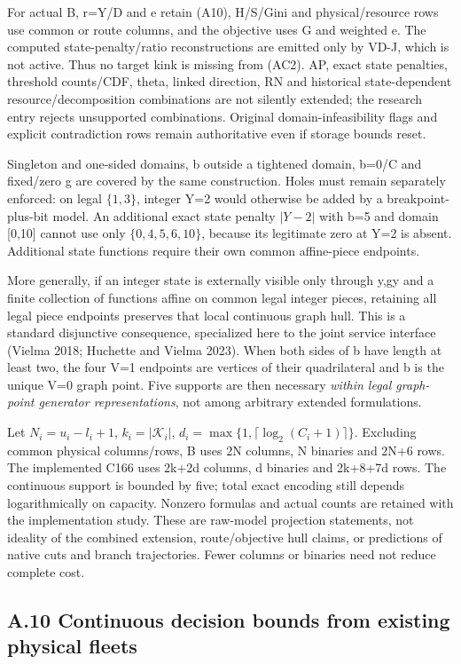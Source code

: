 \documentclass[
  american,
  11pt,
]{article}
\begin{document}
For actual B, r=Y/D and e retain (A10), H/S/Gini and physical/resource
rows use common or route columns, and the objective uses G and weighted
e. The computed state-penalty/ratio reconstructions are emitted only by
VD-J, which is not active. Thus no target kink is missing from (AC2).
AP, exact state penalties, threshold counts/CDF, theta, linked
direction, RN and historical state-dependent resource/decomposition
combinations are not silently extended; the research entry rejects
unsupported combinations. Original domain-infeasibility flags and
explicit contradiction rows remain authoritative even if storage bounds
reset.

Singleton and one-sided domains, b outside a tightened domain, b=0/C and
fixed/zero g are covered by the same construction. Holes must remain
separately enforced: on legal \(\{1,3\}\), integer Y=2 would otherwise
be added by a breakpoint-plus-bit model. An additional exact state
penalty \(|Y-2|\) with b=5 and domain {[}0,10{]} cannot use only
\(\{0,4,5,6,10\}\), because its legitimate zero at Y=2 is absent.
Additional state functions require their own common affine-piece
endpoints.

More generally, if an integer state is externally visible only through
y,gy and a finite collection of functions affine on common legal integer
pieces, retaining all legal piece endpoints preserves that local
continuous graph hull. This is a standard disjunctive consequence,
specialized here to the joint service interface (Vielma 2018; Huchette
and Vielma 2023). When both sides of b have length at least two, the
four V=1 endpoints are vertices of their quadrilateral and b is the
unique V=0 graph point. Five supports are then necessary \emph{within
legal graph-point generator representations}, not among arbitrary
extended formulations.

Let \(N_i=u_i-l_i+1\), \(k_i=|\mathcal K_i|\),
\(d_i=\max\{1,\lceil\log_2(C_i+1)\rceil\}\). Excluding common physical
columns/rows, B uses 2N columns, N binaries and 2N+6 rows. The
implemented C166 uses 2k+2d columns, d binaries and 2k+8+7d rows. The
continuous support is bounded by five; total exact encoding still
depends logarithmically on capacity. Nonzero formulas and actual counts
are retained with the implementation study. These are raw-model
projection statements, not ideality of the combined extension,
route/objective hull claims, or predictions of native cuts and branch
trajectories. Fewer columns or binaries need not reduce complete cost.

\subsection{A.10 Continuous decision bounds from existing physical
fleets}\label{a.10-continuous-decision-bounds-from-existing-physical-fleets}
\end{document}
